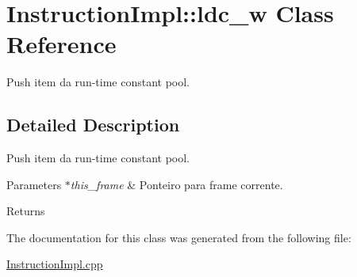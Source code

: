 \hypertarget{class_instruction_impl_1_1ldc__w}{}\section{Instruction\+Impl\+:\+:ldc\+\_\+w Class Reference}
\label{class_instruction_impl_1_1ldc__w}


Push item da run-\/time constant pool.  




\subsection{Detailed Description}
Push item da run-\/time constant pool. 


\begin{DoxyParams}{Parameters}
{\em $\ast$this\+\_\+frame} & Ponteiro para frame corrente. \\
\hline
\end{DoxyParams}
\begin{DoxyReturn}{Returns}

\end{DoxyReturn}


The documentation for this class was generated from the following file\+:\begin{DoxyCompactItemize}
\item 
\hyperlink{_instruction_impl_8cpp}{Instruction\+Impl.\+cpp}\end{DoxyCompactItemize}
